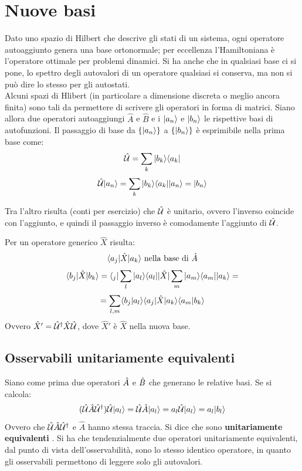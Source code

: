 \section{Nuove basi}
Dato uno spazio di Hilbert che descrive gli stati di un sistema, ogni operatore autoaggiunto genera una base ortonormale; per eccellenza l'Hamiltoniana è l'operatore ottimale per problemi dinamici. Si ha anche che in qualsiasi base ci si pone, lo spettro degli autovalori di un operatore qualsiasi si conserva, ma non si può dire lo stesso per gli autostati.\\
Alcuni spazi di Hlibert (in particolare a dimensione discreta o meglio ancora finita) sono tali da permettere di scrivere gli operatori in forma di matrici. Siano allora due operatori autoaggiungi $\hat A$ e $\hat B$ e i $\Ket {a_n}$ e $\Ket {b_n}$ le rispettive basi di autofunzioni. Il passaggio di base da $\{\Ket {a_n}\}$ a $\{\Ket {b_n}\}$ è esprimibile nella prima base come:
\[
	\U = \sum_k \ketbra{b_k}{a_k} \]\[
	\U\Ket {a_n} = \sum_k \ketbra{b_k}{a_k} \Ket {a_n} = \Ket {b_n}
\]

Tra l'altro risulta (conti per esercizio) che $\U$ è unitario, ovvero l'inverso coincide con l'aggiunto, e quindi il passaggio inverso è comodamente l'aggiunto di $\U$.

Per un operatore generico $\hat X$ risulta:
\[
	\bra a_j | \hat X | a_k \ket \text{ nella base di } \hat A \]\[
	\bra b_j | \hat X | b_k \ket = \bra _j | \sum_l \ketbra{a_l}{a_l} | \hat X | \sum_m \ketbra{a_m}{a_m} | a_k \ket = \]\[
	= \sum_{l,m} \braket{b_j}{a_l} \bra a_j | \hat X | a_k \ket \braket{a_m}{b_k}
\]
Ovvero $\hat X' = \U^\dag \hat X \U$, dove $\hat X'$ è $\hat X$ nella nuova base.

\subsection{Osservabili unitariamente equivalenti}
Siano come prima due operatori $\A$ e $\B$ che generano le relative basi. Se si calcola:
\[
	(\U\hat A\U^\dag)\U\Ket {a_l} = \U\hat A \Ket {a_l} = a_l \U \Ket {a_l} = a_l \Ket {b_l}
\]
Ovvero che $\U\hat A\U^\dag$ e $\hat A$ hanno stessa traccia. Si dice che sono \textbf{unitariamente equivalenti} . Si ha che tendenzialmente due operatori unitariamente equivalenti, dal punto di vista dell'osservabilità, sono lo stesso identico operatore, in quanto gli osservabili permettono di leggere solo gli autovalori.

